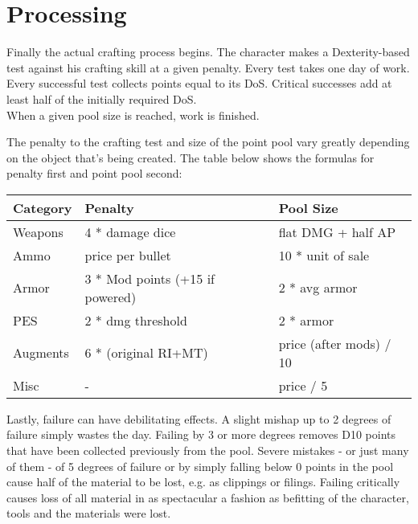 \documentclass[12pt,a4paper,openany,usenames,dvipsnames]{book}
\begin{document}
	\chapter{Processing}
	Finally the actual crafting process begins.
	The character makes a Dexterity-based test against his crafting skill at a given penalty.
	Every test takes one day of work.
	Every successful test collects points equal to its DoS.
	Critical successes add at least half of the initially required DoS.
	\\%
	When a given pool size is reached, work is finished.\par
	The penalty to the crafting test and size of the point pool vary greatly depending on the object that’s being created. The table below shows the formulas for penalty first and point pool second:
	\par
	\begin{tabularx}{\columnwidth}{X|ll}
		Category & Penalty & Pool Size \\ \hline
		Weapons & 4 * damage dice & flat DMG + half AP \\
		Ammo & price per bullet & 10 * unit of sale \\
		Armor & 3 * Mod points (+15 if powered) & 2 * avg armor \\
		PES & 2 * dmg threshold & 2 * armor \\
		Augments & 6 * (original RI+MT) & price (after mods) / 10 \\
		Misc & - & price / 5
	\end{tabularx}\par
	Lastly, failure can have debilitating effects.
	A slight mishap up to 2 degrees of failure simply wastes the day.
	Failing by 3 or more degrees removes D10 points that have been collected previously from the pool.
	Severe mistakes - or just many of them - of 5 degrees of failure or by simply falling below 0 points in the pool cause half of the material to be lost, e.g. as clippings or filings.
	Failing critically causes loss of all material in as spectacular a fashion as befitting of the character, tools and the materials were lost.
\end{document}
